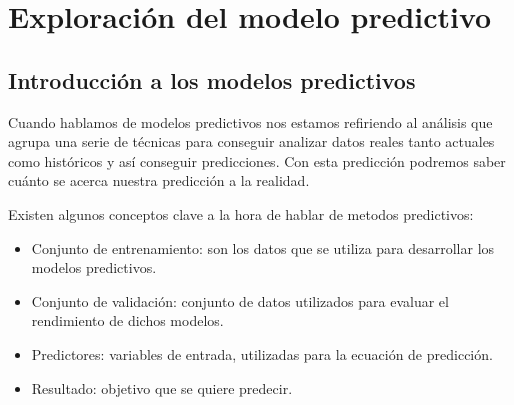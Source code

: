 \cleardoublepage

\chapter{Exploración del modelo predictivo}
\label{makereference4}

\section{Introducción a los modelos predictivos}
\label{makereference4.1}

Cuando hablamos de modelos predictivos nos estamos refiriendo al análisis que agrupa una serie de técnicas para conseguir analizar datos reales tanto actuales como históricos y así conseguir predicciones. Con esta predicción podremos saber cuánto se acerca nuestra predicción a la realidad.

Existen algunos conceptos clave a la hora de hablar de metodos predictivos:

\begin{itemize}
	\item Conjunto de entrenamiento: son los datos que se utiliza para desarrollar los modelos predictivos.
	\item Conjunto de validación: conjunto de datos utilizados para evaluar el rendimiento de dichos modelos.
	\item Predictores: variables de entrada, utilizadas para la ecuación de predicción. 
	\item Resultado: objetivo que se quiere predecir.
\end{itemize}

